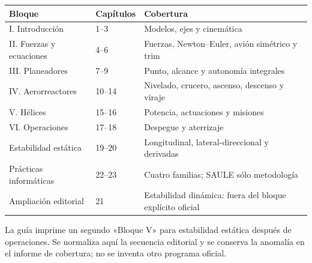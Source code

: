 \begin{longtable}{p{.25\linewidth}p{.13\linewidth}p{.5\linewidth}}\toprule Bloque&Capítulos&Cobertura\\\midrule\endhead
I. Introducción&1--3&Modelos, ejes y cinemática\\
II. Fuerzas y ecuaciones&4--6&Fuerzas, Newton--Euler, avión simétrico y trim\\
III. Planeadores&7--9&Punto, alcance y autonomía integrales\\
IV. Aerorreactores&10--14&Nivelado, crucero, ascenso, descenso y viraje\\
V. Hélices&15--16&Potencia, actuaciones y misiones\\
VI. Operaciones&17--18&Despegue y aterrizaje\\
Estabilidad estática&19--20&Longitudinal, lateral-direccional y derivadas\\
Prácticas informáticas&22--23&Cuatro familias; SAULE sólo metodología\\
Ampliación editorial&21&Estabilidad dinámica: fuera del bloque explícito oficial\\
\bottomrule\end{longtable}
La guía imprime un segundo «Bloque V» para estabilidad estática después de operaciones. Se normaliza aquí la secuencia editorial y se conserva la anomalía en el informe de cobertura; no se inventa otro programa oficial.